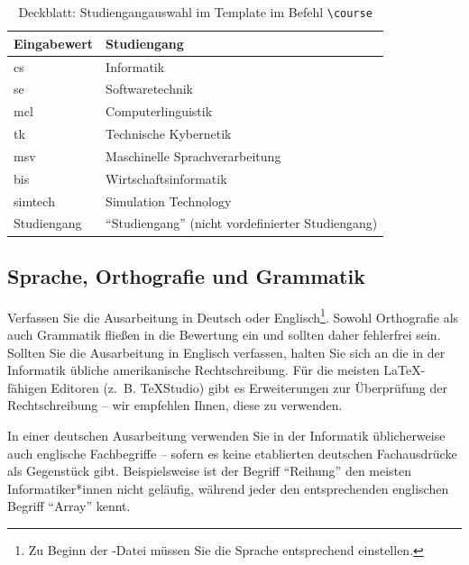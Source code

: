 \documentclass[lang=english]{secseminar}
\begin{document}
\begin{table}
    \begin{tabular}{l|l}
        \textbf{Eingabewert} & \textbf{Studiengang}\\
        \hline
        cs & Informatik\\
        se & Softwaretechnik\\
        mcl & Computerlinguistik\\ 
        tk & Technische Kybernetik\\
        msv & Maschinelle Sprachverarbeitung\\
        bis & Wirtschaftsinformatik\\
        simtech & Simulation Technology\\
        Studiengang & ``Studiengang'' (nicht vordefinierter Studiengang)\\ 
    \end{tabular}
    \caption{Deckblatt: Studiengangauswahl im Template im Befehl \texttt{\textbackslash course}}
    \label{tab:studiengangauswahl}
\end{table}


\subsection{Sprache, Orthografie und Grammatik}
Verfassen Sie die Ausarbeitung in Deutsch oder Englisch\footnote{Zu Beginn der -Datei
  müssen Sie die Sprache entsprechend einstellen.}. Sowohl Orthografie als auch Grammatik fließen in
die Bewertung ein und sollten daher fehlerfrei sein.  Sollten Sie die Ausarbeitung in Englisch
verfassen, halten Sie sich an die in der Informatik übliche amerikanische Rechtschreibung.  Für die
meisten \LaTeX-fähigen Editoren (z.~B. TeXStudio) gibt es Erweiterungen zur Überprüfung der
Rechtschreibung -- wir empfehlen Ihnen, diese zu verwenden.

In einer deutschen Ausarbeitung verwenden Sie in der Informatik üblicherweise auch englische
Fachbegriffe -- sofern es keine etablierten deutschen Fachausdrücke als Gegenstück
gibt. Beispielsweise ist der Begriff ``Reihung'' den meisten Informatiker*innen nicht geläufig, während
jeder den entsprechenden englischen Begriff ``Array'' kennt.
\end{document}
